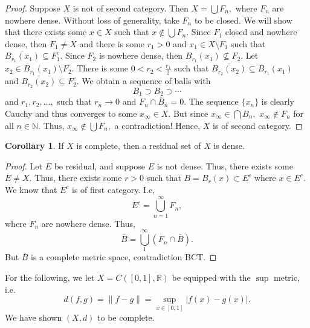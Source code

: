 \documentclass[10pt, oneside]{article}
\newcommand{\bbR}{\mathbb{R}}
\newcommand{\bbN}{\mathbb{N}}
\newcommand{\sm}{\setminus}
\theoremstyle{definition}
\newtheorem{cor}{Corollary}
\begin{document}
\begin{proof}
    Suppose $X$ is not of second category. Then $X  = \bigcup F_n,$ where $F_n$ are nowhere dense. Without loss of generality, take $F_n$ to be closed. We will show that there exists some $x\in X$ such that $x\notin \bigcup F_n.$ Since $F_1$ closed and nowhere dense, then $F_1 \neq X$ and there is some ${r_1}>0$ and $x_1 \in X\sm F_1$ such that $\overline{B_{r_1}(x_1)} \subseteq F_1^c.$ Since $F_2$ is  nowhere dense, then $B_{r_1}(x_1)\not\subseteq F_2.$ Let $x_2 \in B_{r_1}(x_1) \sm F_2.$ There is some $0<r_2< \frac{r_1}{2}$ such that $\overline{B_{r_2}(x_2)}\subseteq B_{r_1}(x_1)$ and $\overline{B_{r_2}(x_2)}\subseteq F_2^c.$ We obtain a sequence of balls with \[B_1\supset B_2 \supset \cdots \] and $r_1, r_2,\dots,$ such that $r_n \to 0$ and  $F_n \cap \overline{B}_n= 0.$ The sequence $\{x_n\}$ is clearly Cauchy and thus converges to some $x_\infty \in X.$ But since $x_\infty \in \bigcap B_n,$ $x_\infty \notin F_n$ for all $n \in \bbN.$ Thus, $x_\infty \notin \bigcup F_n,$ a contradiction! Hence, $X$ is of second category.  
\end{proof}
\begin{cor}
    If $X$ is complete, then a residual set of $X$ is dense. 
\end{cor}
\begin{proof}
    Let $E$ be residual, and suppose $E$ is not dense. Thus, there exists some $\overline{E} \neq X.$ Thus, there exists some $r>0$ such that $B = B_r(x) \subset E^c$ where $x\in E^c.$ We know that $E^c$ is of first category. I.e, 
    \[E^c = \bigcup_{n=1}^\infty F_n,\] where $F_n$ are nowhere dense. Thus, 
    \[\overline{B} = \bigcup_{1}^\infty (F_n \cap \overline{B}).\] But $\overline{B}$ is a complete metric space, contradiction BCT.
\end{proof}

For the following, we let $X = C([0,1], \bbR)$ be equipped with the $\sup$ metric, i.e.
\[d(f,g) = \|f-g\| = \sup_{x\in [0,1]}|f(x) - g(x)|.\]
We have shown $(X,d)$ to be complete. 
\end{document}
